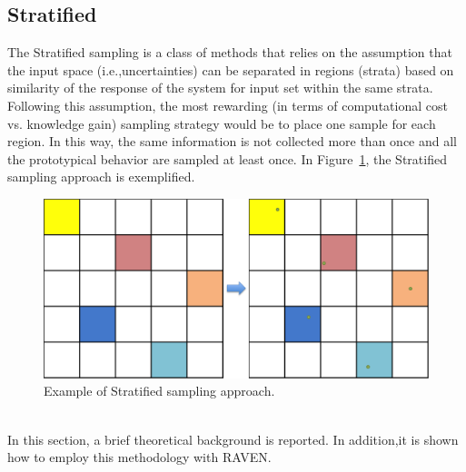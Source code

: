 \subsection{Stratified}
\label{sub:Stratified}
The Stratified sampling is a class of methods that relies on the assumption that the input space (i.e.,uncertainties) 
can be separated in regions (strata) based on similarity of the response of the system for input set within the
same strata. Following this assumption, the most rewarding (in terms of computational cost vs. knowledge gain) 
sampling strategy would be to place one sample for each region. In this way, the same information is not 
collected more than once and all the prototypical behavior are sampled at least once. In 
Figure~\ref{fig:StratifiedSamplingExample}, the Stratified sampling approach is exemplified. 
 \begin{figure}[h!]
  \centering
  \includegraphics[scale=0.55]{pics/StratifiedSamplingExample.png}
  \caption{Example of Stratified sampling approach.}
  \label{fig:StratifiedSamplingExample}
 \end{figure}
\\In this section, a brief theoretical 
background is reported. In addition,it is shown how to employ this methodology with RAVEN.
